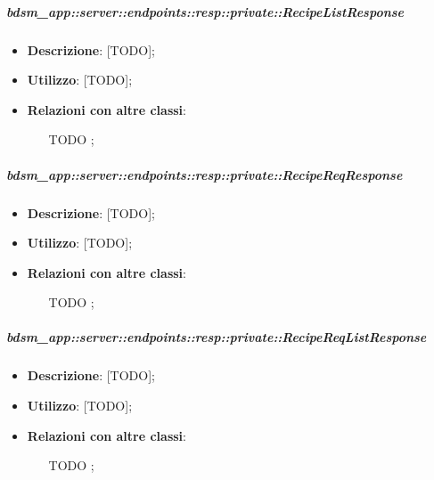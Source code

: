     \subparagraph{bdsm\_app::server::endpoints::resp::private::RecipeListResponse} %
    \label{subp:bdsm_app_server_endpoints_resp_private_recipelistresponse}
    \begin{itemize}
      \item \textbf{Descrizione}: [TODO];
      \item \textbf{Utilizzo}: [TODO];
      \item \textbf{Relazioni con altre classi}:
        \begin{itemize}
          \item [TODO];
        \end{itemize}
      \end{itemize}
    
    \subparagraph{bdsm\_app::server::endpoints::resp::private::RecipeReqResponse} %
    \label{subp:bdsm_app_server_endpoints_resp_private_recipereqresponse}
    \begin{itemize}
      \item \textbf{Descrizione}: [TODO];
      \item \textbf{Utilizzo}: [TODO];
      \item \textbf{Relazioni con altre classi}:
        \begin{itemize}
          \item [TODO];
        \end{itemize}
      \end{itemize}
    
    \subparagraph{bdsm\_app::server::endpoints::resp::private::RecipeReqListResponse} %
    \label{subp:bdsm_app_server_endpoints_resp_private_recipereqlistresponse}
    \begin{itemize}
      \item \textbf{Descrizione}: [TODO];
      \item \textbf{Utilizzo}: [TODO];
      \item \textbf{Relazioni con altre classi}:
        \begin{itemize}
          \item [TODO];
        \end{itemize}
      \end{itemize}
    
